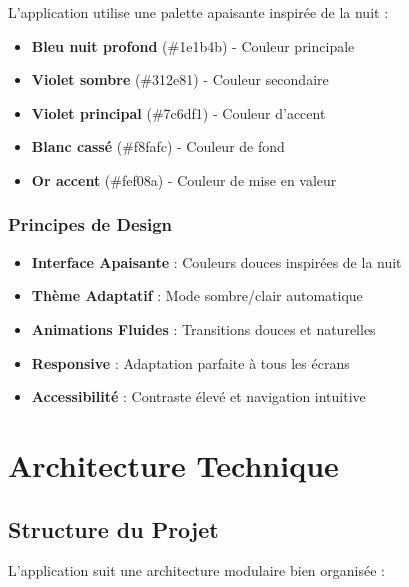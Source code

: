 \documentclass[12pt,a4paper]{article}
\begin{document}
L'application utilise une palette apaisante inspirée de la nuit :

\begin{itemize}
    \item \textbf{Bleu nuit profond} (\#1e1b4b) - Couleur principale
    \item \textbf{Violet sombre} (\#312e81) - Couleur secondaire
    \item \textbf{Violet principal} (\#7c6df1) - Couleur d'accent
    \item \textbf{Blanc cassé} (\#f8fafc) - Couleur de fond
    \item \textbf{Or accent} (\#fef08a) - Couleur de mise en valeur
\end{itemize}

\subsubsection{Principes de Design}

\begin{itemize}
    \item \textbf{Interface Apaisante} : Couleurs douces inspirées de la nuit
    \item \textbf{Thème Adaptatif} : Mode sombre/clair automatique
    \item \textbf{Animations Fluides} : Transitions douces et naturelles
    \item \textbf{Responsive} : Adaptation parfaite à tous les écrans
    \item \textbf{Accessibilité} : Contraste élevé et navigation intuitive
\end{itemize}

\section{Architecture Technique}

\subsection{Structure du Projet}

L'application suit une architecture modulaire bien organisée :
\end{document}
